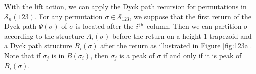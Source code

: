 \documentclass[
final,nomarks
]{dmtcs-episciences}
\newcommand{\fref}[1]{Figure \ref{fig:#1}}
\newcommand{\Sn}[1]{\mathcal{S}_{#1}}
\newcommand{\thn}[1]{\begin{math}#1^\textnormal{th}\end{math}}
\begin{document}
With the lift action, we can apply the Dyck path recursion for permutations in \begin{math}\Sn{n}(123)\end{math}. For any permutation \begin{math}\sigma\in\Sn{123}\end{math}, we suppose that the first return of the Dyck path \begin{math}\Psi(\sigma)\end{math} 
of \begin{math}\sigma\end{math} is located after the \thn{i} column. 
Then we can partition \begin{math}\sigma\end{math} according to the structure \begin{math}A_i(\sigma)\end{math} before the return on a height \begin{math}1\end{math} trapezoid and a Dyck path structure \begin{math}B_i(\sigma)\end{math} after the return as illustrated in \fref{123a}. 
Note that if \begin{math}\sigma_j\end{math} is in \begin{math}B(\sigma_i)\end{math}, then \begin{math}\sigma_j\end{math} is a peak of \begin{math}\sigma\end{math} if and only if it is 
peak of \begin{math}B_i(\sigma)\end{math}.
\end{document}
